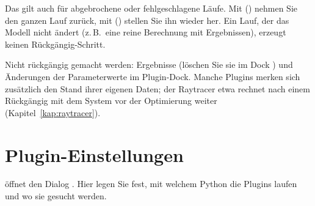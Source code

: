 Das gilt auch für abgebrochene oder fehlgeschlagene Läufe. Mit 
() nehmen Sie den ganzen Lauf zurück, mit 
() stellen Sie ihn wieder her. Ein Lauf, der das Modell nicht ändert
(z.\,B.\ eine reine Berechnung mit Ergebnissen), erzeugt keinen Rückgängig-Schritt.

\begin{hinweis}
Nicht rückgängig gemacht werden: Ergebnisse (löschen Sie sie im Dock ) und
Änderungen der Parameterwerte im Plugin-Dock. Manche Plugins merken sich zusätzlich den Stand
ihrer eigenen Daten; der Raytracer etwa rechnet nach einem Rückgängig mit dem System vor der
Optimierung weiter (Kapitel~\ref{kap:raytracer}).
\end{hinweis}

\section{Plugin-Einstellungen}\label{sec:plugin-einstellungen}

 öffnet den Dialog . Hier legen Sie fest, mit
welchem Python die Plugins laufen und wo sie gesucht werden.


